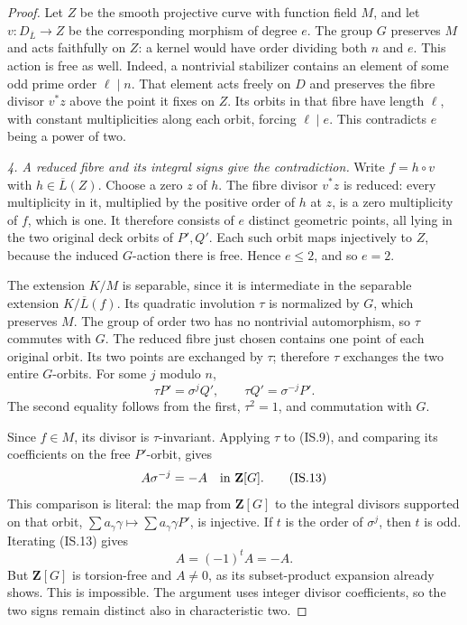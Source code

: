 \documentclass[11pt,a4paper]{article}
\begin{document}
\begin{proof}
Let $Z$ be the smooth projective curve with function field $M$,
and let $v:D_{\overline L}\to Z$ be the corresponding morphism
of degree $e$. The group $G$ preserves $M$ and acts faithfully
on $Z$: a kernel would have order dividing both $n$ and $e$.
This action is free as well. Indeed, a nontrivial stabilizer
contains an element of some odd prime order $\ell\mid n$.
That element acts freely on $D$ and preserves the fibre divisor
$v^*z$ above the point it fixes on $Z$. Its orbits in that fibre
have length $\ell$, with constant multiplicities along each
orbit, forcing $\ell\mid e$. This contradicts $e$ being a
power of two.

\emph{4. A reduced fibre and its integral signs give the contradiction.}
Write $f=h\circ v$ with $h\in\overline L(Z)$.
Choose a zero $z$ of $h$. The fibre divisor $v^*z$ is reduced:
every multiplicity in it, multiplied by the positive order of
$h$ at $z$, is a zero multiplicity of $f$, which is one.
It therefore consists of $e$ distinct geometric points, all
lying in the two original deck orbits of $P',Q'$.
Each such orbit maps injectively to $Z$, because the induced
$G$-action there is free. Hence $e\le2$, and so $e=2$.

The extension $K/M$ is separable, since it is intermediate in
the separable extension $K/\overline L(f)$. Its quadratic
involution $\tau$ is normalized by $G$, which preserves $M$.
The group of order two has no nontrivial automorphism, so
$\tau$ commutes with $G$.
The reduced fibre just chosen contains one point of each
original orbit. Its two points are exchanged by $\tau$;
therefore $\tau$ exchanges the two entire $G$-orbits.
For some $j$ modulo $n$,
\[
                  \tau P'=\sigma^jQ',\qquad
                  \tau Q'=\sigma^{-j}P'.
 \tag{IS.12}
\]
The second equality follows from the first, $\tau^2=1$,
and commutation with $G$.

Since $f\in M$, its divisor is $\tau$-invariant. Applying
$\tau$ to (IS.9), and comparing its coefficients on the free
$P'$-orbit, gives
\[
                         A\sigma^{-j}=-A
                                \quad\hbox{in }\mathbf Z[G].
 \tag{IS.13}
\]
This comparison is literal: the map from $\mathbf Z[G]$
to the integral divisors supported on that orbit,
$\sum a_\gamma\gamma\mapsto\sum a_\gamma\gamma P'$,
is injective. If $t$ is the order of $\sigma^j$, then $t$
is odd. Iterating (IS.13) gives
\[
                           A=(-1)^tA=-A.
\]
But $\mathbf Z[G]$ is torsion-free and $A\ne0$, as its
subset-product expansion already shows. This is impossible.
The argument uses integer divisor coefficients, so the two
signs remain distinct also in characteristic two.


\end{proof}
\end{document}
